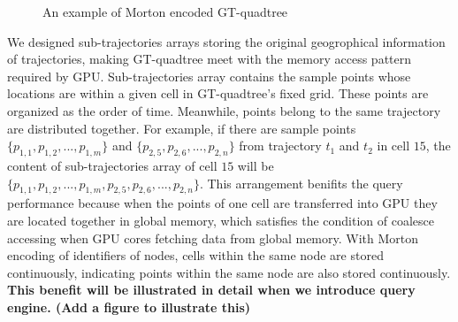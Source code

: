 \documentclass[conference]{IEEEtran}
\begin{document}
\begin{figure}[htbp]
	\centering
	\hfil
	\hfil
	\caption{An example of Morton encoded GT-quadtree}
	\label{GTQuadtree}
\end{figure}

We designed sub-trajectories arrays storing the original geogrophical information of trajectories, making GT-quadtree meet with the memory access pattern required by GPU. Sub-trajectories array contains the sample points whose locations are within a given cell in GT-quadtree's fixed grid. These points are organized as the order of time. Meanwhile, points belong to the same trajectory are distributed together. For example, if there are sample points $\{p_{1,1},p_{1,2},...,p_{1,m}\}$ and $\{p_{2,5},p_{2,6},...,p_{2,n}\}$ from trajectory $t_{1}$ and $t_{2}$ in cell $15$, the content of sub-trajectories array of cell $15$ will be $\{p_{1,1},p_{1,2},...,p_{1,m},p_{2,5},p_{2,6},...,p_{2,n}\}$. This arrangement benifits the query performance because when the points of one cell are transferred into GPU they are located together in global memory, which satisfies the condition of coalesce accessing when GPU cores fetching data from global memory. With Morton encoding of identifiers of nodes, cells within the same node are stored continuously, indicating points within the same node are also stored continuously. \textbf{This benefit will be illustrated in detail when we introduce query engine. (Add a figure to illustrate this)}
\end{document}
